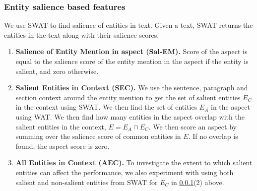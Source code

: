 \documentclass[sigconf,authordraft]{acmart}
\begin{document}
\subsubsection{Entity salience based features}
\label{subsubsec:Entity salience based features}
We use SWAT \cite{swat} to find salience of entities in text. Given a text, SWAT returns the entities in the text along with their salience scores.
\begin{enumerate}
    \item \textbf{Salience of Entity Mention in aspect (Sal-EM).} Score of the aspect is equal to the salience score of the entity mention in the aspect if the entity is salient, and zero otherwise.
    
    \item \textbf{Salient Entities in Context (SEC).} We use the sentence, paragraph and section context around the entity mention to get the set of salient entities $E_C$ in the context using SWAT. We then find the set of entities $E_A$ in the aspect using WAT\cite{piccinno2014wat}. We then find how many entities in the aspect overlap with the salient entities in the context, $E = E_A \cap E_C$. We then score an aspect by summing over the salience score of common entities in $E$. If no overlap is found, the aspect score is zero.
    
    
    \item \textbf{All Entities in Context (AEC).} To investigate the extent to which salient entities can affect the performance, we also experiment with using both salient and non-salient entities from SWAT for $E_C$ in \ref{subsubsec:Entity salience based features}(2) above. 
\end{enumerate}
\end{document}

